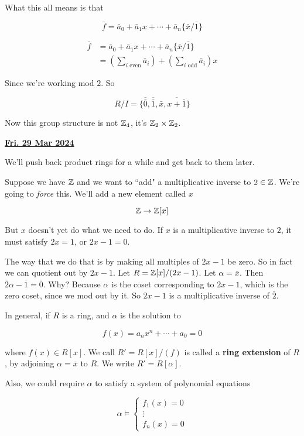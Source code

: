 \documentclass[12pt]{article}
\renewcommand{\date}[1]{\underline{\bf #1}}
\begin{document}
{  What this all means is that

  \[
    \bar f = \bar a_0 + \bar a_1 x + \cdots + \bar a_n \{ \bar x / \bar 1 \}
  \]

  \begin{align*}
    \bar f &= \bar a_0 + \bar a_1 x + \cdots + \bar a_n \{ \bar x / \bar 1 \} \\
           &= \left(\sum_{i \text{ even}} \bar a_i\right) + \left(\sum_{i \text{ odd}} \bar a_i\right) x
  \end{align*}

  Since we're working mod $2$. So 

  \[
    R / I = \{\overline{\bar 0}, \overline{\bar 1}, \bar x, \overline{x + \bar 1}\}
  \]

  Now this group structure is not ${\mathbb Z}_4$, it's ${\mathbb Z}_2 \times {\mathbb Z}_2$.
}


\date{Fri. 29 Mar 2024}

We'll push back product rings for a while and get back to them later.

Suppose we have ${\mathbb Z}$ and we want to ``add" a multiplicative inverse to $2 \in
{\mathbb Z}$. We're going to {\it force} this. We'll add a new element called $x$

\[
  {\mathbb Z} \to {\mathbb Z}[x]
\]

But $x$ doesn't yet do what we need to do. If $x$ is a multiplicative inverse to
$2$, it must satisfy $2x = 1$, or $2x - 1 = 0$.

The way that we do that is by making all multiples of $2x - 1$ be zero. So in
fact we can quotient out by $2x - 1$. Let $R = {\mathbb Z}[x] / (2x - 1)$. Let $\alpha =
\bar x$. Then $\bar 2 \alpha - \bar 1 = \bar 0$. Why? Because $\alpha$ is the
coset corresponding to $2x - 1$, which is the zero coset, since we mod out by
it. So $2x - 1$ is a multiplicative inverse of $\bar 2$.

In general, if $R$ is a ring, and $\alpha$ is the solution to 

\[
  f(x) = a_n x^n + \cdots + a_0 = 0
\]

where $f(x) \in R[x]$. We call $R' = R[x] / (f)$ is called a {\bf ring
extension} of $R$, by adjoining $\alpha = \bar x$ to $R$. We write $R' =
R[\alpha]$.

Also, we could require $\alpha$ to satisfy a system of polynomial equations

\[
  \alpha \models \begin{cases*}
    f_1(x) = 0 \\
    \vdots \\
    f_n(x) = 0
  \end{cases*}
\]
\end{document}
